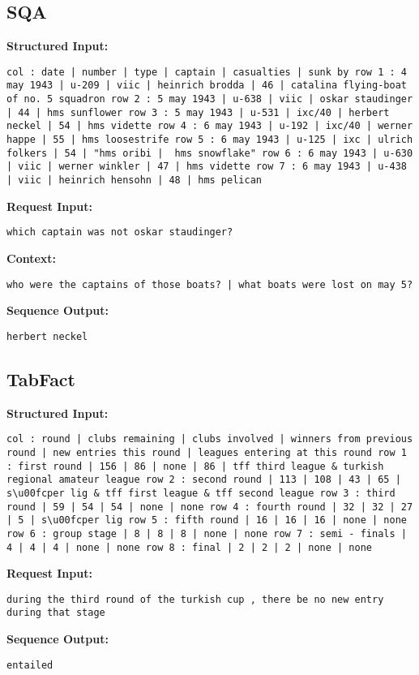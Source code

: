\documentclass[11pt]{article}
\begin{document}
\subsection{SQA}
\textbf{Structured Input:} 
\begin{lstlisting}
col : date | number | type | captain | casualties | sunk by row 1 : 4 may 1943 | u-209 | viic | heinrich brodda | 46 | catalina flying-boat of no. 5 squadron row 2 : 5 may 1943 | u-638 | viic | oskar staudinger | 44 | hms sunflower row 3 : 5 may 1943 | u-531 | ixc/40 | herbert neckel | 54 | hms vidette row 4 : 6 may 1943 | u-192 | ixc/40 | werner happe | 55 | hms loosestrife row 5 : 6 may 1943 | u-125 | ixc | ulrich folkers | 54 | "hms oribi |  hms snowflake" row 6 : 6 may 1943 | u-630 | viic | werner winkler | 47 | hms vidette row 7 : 6 may 1943 | u-438 | viic | heinrich hensohn | 48 | hms pelican
\end{lstlisting}
\textbf{Request Input:} 
\begin{lstlisting}
which captain was not oskar staudinger? 
\end{lstlisting}
\textbf{Context:} \begin{lstlisting}
who were the captains of those boats? | what boats were lost on may 5?
\end{lstlisting}
\textbf{Sequence Output:} 
\begin{lstlisting}
herbert neckel
\end{lstlisting}

\subsection{TabFact}
\textbf{Structured Input:} 
\begin{lstlisting}
col : round | clubs remaining | clubs involved | winners from previous round | new entries this round | leagues entering at this round row 1 : first round | 156 | 86 | none | 86 | tff third league & turkish regional amateur league row 2 : second round | 113 | 108 | 43 | 65 | s\u00fcper lig & tff first league & tff second league row 3 : third round | 59 | 54 | 54 | none | none row 4 : fourth round | 32 | 32 | 27 | 5 | s\u00fcper lig row 5 : fifth round | 16 | 16 | 16 | none | none row 6 : group stage | 8 | 8 | 8 | none | none row 7 : semi - finals | 4 | 4 | 4 | none | none row 8 : final | 2 | 2 | 2 | none | none
\end{lstlisting}
\textbf{Request Input:} 
\begin{lstlisting}
during the third round of the turkish cup , there be no new entry during that stage
\end{lstlisting}
\textbf{Sequence Output:} 
\begin{lstlisting}
entailed
\end{lstlisting}
\end{document}
